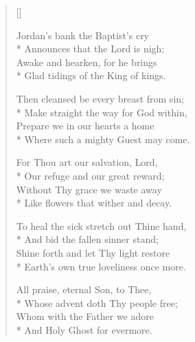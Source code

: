 \newHymn
{}

\begin{verse}[\versewidth]

 Jordan's bank the Baptist's cry\\*
Announces that the Lord is nigh;\\
Awake and hearken, for he brings\\*
Glad tidings of the King of kings.

Then cleansed be every breast from sin;\\*
Make straight the way for God within,\\
Prepare we in our hearts a home\\*
Where such a mighty Guest may come.

For Thou art our salvation, Lord,\\*
Our refuge and our great reward;\\
Without Thy grace we waste away\\*
Like flowers that wither and decay.

To heal the sick stretch out Thine hand,\\*
And bid the fallen sinner stand;\\
Shine forth and let Thy light restore\\*
Earth's own true loveliness once more.

All praise, eternal Son, to Thee,\\*
Whose advent doth Thy people free;\\
Whom with the Father we adore\\*
And Holy Ghost for evermore.

\end{verse}


